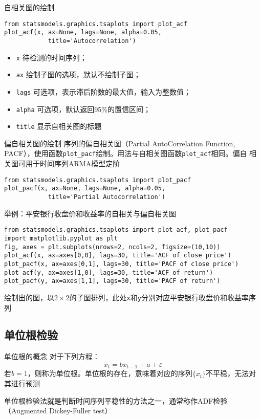 \documentclass[t]{beamer}
\begin{document}
\begin{frame}[fragile]{自相关图的绘制}
\begin{lstlisting}
from statsmodels.graphics.tsaplots import plot_acf
plot_acf(x, ax=None, lags=None, alpha=0.05, 
            title='Autocorrelation')
\end{lstlisting}
\begin{itemize}
    \item \verb|x| 待检测的时间序列；
    \item \verb|ax| 绘制子图的选项，默认不绘制子图；
    \item \verb|lags| 可选项，表示滞后阶数的最大值，输入为整数值；
    \item \verb|alpha| 可选项，默认返回95\%的置信区间；
    \item \verb|title| 显示自相关图的标题
\end{itemize}
\end{frame}

\begin{frame}[fragile]{偏自相关图的绘制}
序列的偏自相关图（Partial AutoCorrelation Function, PACF），使用函数\verb|plot_pacf|绘制。用法与自相关图函数\verb|plot_acf|相同。偏自
相关图可用于时间序列ARMA模型定阶
\begin{lstlisting}
from statsmodels.graphics.tsaplots import plot_pacf
plot_pacf(x, ax=None, lags=None, alpha=0.05, 
            title='Partial Autocorrelation')
\end{lstlisting}
\end{frame}


\begin{frame}[fragile]{举例：平安银行收盘价和收益率的自相关与偏自相关图}
\normalsize
\begin{lstlisting}
from statsmodels.graphics.tsaplots import plot_acf, plot_pacf 
import matplotlib.pyplot as plt
fig, axes = plt.subplots(nrows=2, ncols=2, figsize=(10,10))
plot_acf(x, ax=axes[0,0], lags=30, title='ACF of close price') 
plot_pacf(x, ax=axes[0,1], lags=30, title='PACF of close price') 
plot_acf(y, ax=axes[1,0], lags=30, title='ACF of return') 
plot_pacf(y, ax=axes[1,1], lags=30, title='PACF of return') 
\end{lstlisting} 

绘制出的图，以$2\times 2$的子图排列，此处\verb|x|和\verb|y|分别对应平安银行收盘价和收益率序列
\end{frame}

\subsection{单位根检验}
\begin{frame}[fragile]{单位根的概念}
对于下列方程：
\[x_t=bx_{t-1}+a+\varepsilon\]
若$b=1$，则称为单位根。单位根的存在，意味着对应的序列$\{x_t\}$不平稳，无法对其进行预测

单位根检验法就是判断时间序列平稳性的方法之一，通常称作ADF检验（Augmented Dickey-Fuller test）
\end{frame}
\end{document}
